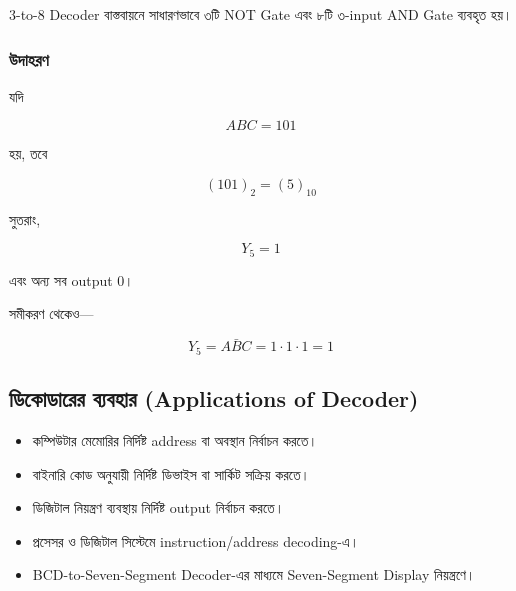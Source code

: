 \par\endgroup

\par\begingroup

\textenglish{3-to-8 Decoder} বাস্তবায়নে সাধারণভাবে
৩টি \textenglish{NOT Gate} এবং
৮টি ৩-\textenglish{input AND Gate} ব্যবহৃত হয়।
\par\endgroup



\subsubsection*{উদাহরণ}

যদি

\[
ABC=101
\]

হয়, তবে

\[
(101)_2=(5)_{10}
\]

সুতরাং,

\[
\boxed{Y_5=1}
\]

এবং অন্য সব \textenglish{output} \(0\)।

সমীকরণ থেকেও—

\[
Y_5=A\bar B C
=1\cdot1\cdot1
=1
\]


\subsection{ডিকোডারের ব্যবহার
(\textenglish{Applications of Decoder})}
\begin{itemize}[label={{\bulletfont\textbullet}}, leftmargin=*, nosep]

\item
কম্পিউটার মেমোরির নির্দিষ্ট
\textenglish{address} বা অবস্থান নির্বাচন করতে।

\item
বাইনারি কোড অনুযায়ী নির্দিষ্ট
ডিভাইস বা সার্কিট সক্রিয় করতে।

\item
ডিজিটাল নিয়ন্ত্রণ ব্যবস্থায় নির্দিষ্ট
\textenglish{output} নির্বাচন করতে।

\item
প্রসেসর ও ডিজিটাল সিস্টেমে
\textenglish{instruction/address decoding}-এ।

\item
\textenglish{BCD-to-Seven-Segment Decoder}-এর মাধ্যমে
\textenglish{Seven-Segment Display} নিয়ন্ত্রণে।

\end{itemize}

